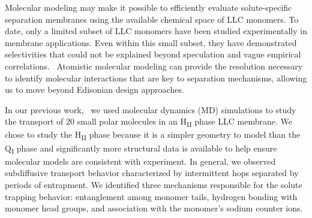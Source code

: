 \documentclass[aps,pre,preprint,groupedaddress]{revtex4-2}
\begin{document}
  Molecular modeling may make it possible to efficiently evaluate solute-specific separation
  membranes using the available chemical space of LLC monomers. To date, only a limited 
  subset of LLC monomers have been studied experimentally in membrane applications.
  \cite{carter_glycerol-based_2012,hatakeyama_nanoporous_2010,smith_ordered_1997,zhou_assembly_2003,resel_structural_2000}
  Even within this small subset, they have demonstrated selectivities that could not be
  explained beyond speculation and vague empirical correlations.~\cite{dischinger_application_2017}
  Atomistic molecular modeling can provide the resolution necessary to identify molecular 
  interactions that are key to separation mechanisms, allowing us to move beyond 
  Edisonian design approaches.

  In our previous work,~\cite{coscia_chemically_2019} we used molecular dynamics (MD) 
  simulations to study the transport of 20 small polar molecules in an H\textsubscript{II}
  phase LLC membrane.
  We chose to study the H\textsubscript{II} phase because it is a simpler geometry to model than 
  the Q\textsubscript{I} phase
  and significantly more structural data is available to help ensure molecular models are consistent with experiment.
  In general, we observed subdiffusive transport behavior characterized by intermittent hops 
  separated by periods of entrapment. We identified three mechanisms responsible for the 
  solute trapping behavior: entanglement among monomer tails, hydrogen bonding with monomer
  head groups, and association with the monomer's sodium counter ions.
  
\end{document}
